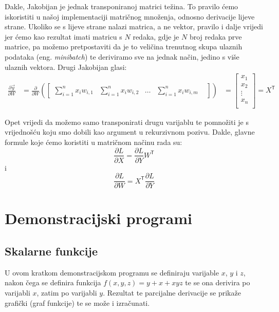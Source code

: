 \documentclass[zavrsnirad]{fer}
\begin{document}
Dakle, Jakobijan je jednak transponiranoj matrici težina. To pravilo ćemo iskoristiti u našoj implementaciji matričnog množenja, odnosno derivacije lijeve strane. Ukoliko se s lijeve strane nalazi matrica, a ne vektor, pravilo i dalje vrijedi jer ćemo kao rezultat imati matricu s $N$ redaka, gdje je $N$ broj redaka prve matrice, pa možemo pretpostaviti da je to veličina trenutnog skupa ulaznih podataka (eng. \textit{minibatch}) te deriviramo sve na jednak način, jedino s više ulaznih vektora. Drugi Jakobijan glasi:
\begin{align*}
  \frac{\partial \vec{y}}{\partial W} &=
  \frac{\partial}{\partial W}
  \left(
    \begin{bmatrix}
      \sum_{i=1}^{n} x_i w_{i,1} &
      \sum_{i=1}^{n} x_i w_{i,2} &
      \dots &
      \sum_{i=1}^{n} x_i w_{i,m} &
    \end{bmatrix}
  \right)
  &=
  \begin{bmatrix}
    x_1 \\
    x_2 \\
    \vdots \\
    x_n \\
  \end{bmatrix}
  = X^\mathsf{T}
\end{align*}

 Opet vrijedi da možemo samo transponirati drugu varijablu te pomnožiti je s vrijednošću koju smo dobili kao argument u rekurzivnom pozivu. Dakle, glavne formule koje ćemo koristiti u matričnom načinu rada su:
\begin{equation}
  \frac{\partial L}{\partial X} = \frac{\partial L}{\partial Y} W^\mathsf{T}
\end{equation}
 i
\begin{equation}
  \frac{\partial L}{\partial W} = X^\mathsf{T} \frac{\partial L}{\partial Y}
\end{equation}
\cite{backprop:michigan}

\pagebreak
\section{Demonstracijski programi}
\subsection{Skalarne funkcije}
U ovom kratkom demonstracijskom programu se definiraju varijable $x$, $y$ i $z$, nakon čega se definira funkcija $f(x, y, z) = y + x + xyz$ te se ona derivira po varijabli $x$, zatim po varijabli $y$. Rezultat te parcijalne derivacije se prikaže grafički (graf funkcije) te se može i izračunati.
\end{document}
